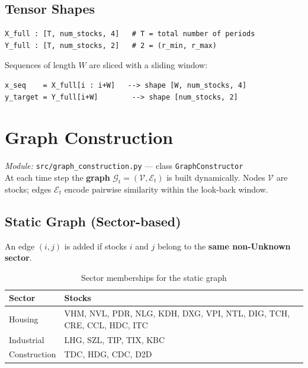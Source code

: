 \documentclass[12pt,a4paper]{article}
\newcommand{\codeinline}[1]{\texttt{\small #1}}
\begin{document}
\subsection{Tensor Shapes}

\begin{lstlisting}
X_full : [T, num_stocks, 4]   # T = total number of periods
Y_full : [T, num_stocks, 2]   # 2 = (r_min, r_max)
\end{lstlisting}

Sequences of length $W$ are sliced with a sliding window:

\begin{lstlisting}
x_seq    = X_full[i : i+W]   --> shape [W, num_stocks, 4]
y_target = Y_full[i+W]        --> shape [num_stocks, 2]
\end{lstlisting}

\section{Graph Construction}

\textit{Module:} \codeinline{src/graph\_construction.py} — class \codeinline{GraphConstructor}\\
At each time step the \textbf{graph} $\mathcal{G}_t = (\mathcal{V}, \mathcal{E}_t)$ is built dynamically. Nodes $\mathcal{V}$ are stocks; edges $\mathcal{E}_t$ encode pairwise similarity within the look-back window.

\subsection{Static Graph (Sector-based)}
An edge $(i, j)$ is added if stocks $i$ and $j$ belong to the \textbf{same non-Unknown sector}.

\begin{table}[H]
\centering
\begin{tabular}{L{3cm} L{10cm}}
\toprule
\textbf{Sector} & \textbf{Stocks} \\
\midrule
Housing      & VHM, NVL, PDR, NLG, KDH, DXG, VPI, NTL, DIG, TCH, CRE, CCL, HDC, ITC \\
Industrial   & LHG, SZL, TIP, TIX, KBC \\
Construction & TDC, HDG, CDC, D2D \\
\bottomrule
\end{tabular}
\caption{Sector memberships for the static graph}
\end{table}
\end{document}
